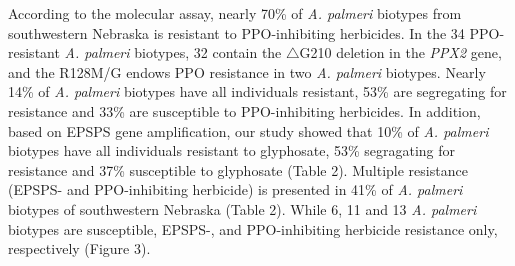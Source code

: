 \documentclass[10pt,letterpaper]{article}
\begin{document}
According to the molecular assay, nearly 70\% of \emph{A. palmeri}
biotypes from southwestern Nebraska is resistant to PPO-inhibiting
herbicides. In the 34 PPO-resistant \emph{A. palmeri} biotypes, 32
contain the \(\triangle\)G210 deletion in the \emph{PPX2} gene, and the
R128M/G endows PPO resistance in two \emph{A. palmeri} biotypes. Nearly
14\% of \emph{A. palmeri} biotypes have all individuals resistant, 53\%
are segregating for resistance and 33\% are susceptible to
PPO-inhibiting herbicides. In addition, based on EPSPS gene
amplification, our study showed that 10\% of \emph{A. palmeri} biotypes
have all individuals resistant to glyphosate, 53\% segragating for
resistance and 37\% susceptible to glyphosate (Table 2). Multiple
resistance (EPSPS- and PPO-inhibiting herbicide) is presented in 41\% of
\emph{A. palmeri} biotypes of southwestern Nebraska (Table 2). While 6,
11 and 13 \emph{A. palmeri} biotypes are susceptible, EPSPS-, and
PPO-inhibiting herbicide resistance only, respectively (Figure 3).
\end{document}
